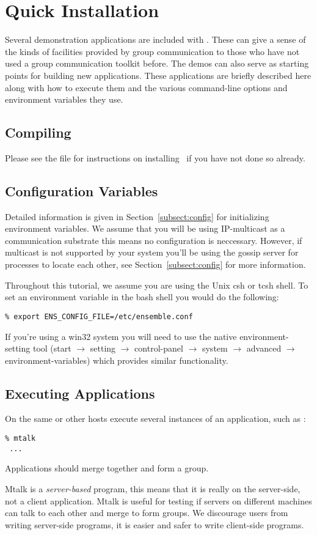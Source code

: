 \section{Quick Installation} 

Several demonstration applications are included with \ensemble.
These can give a sense of the kinds of facilities provided by group
communication to those who have not used a group communication
toolkit before.  The demos can also serve as starting points for
building new applications.  These applications are briefly described
here along with how to execute them and the various command-line
options and environment variables they use.

\subsection{Compiling}
Please see the file  for instructions on
installing \ensemble\ if you have not done so already.

\subsection{Configuration Variables}
Detailed information is given in Section~\ref{subsect:config} for
initializing environment variables. We assume that you will be using
IP-multicast as a communication substrate this means no configuration
is neccessary. However, if multicast is not supported by your system you'll
be using the gossip server for processes to locate each
other, see Section~\ref{subsect:config} for more information.

Throughout this tutorial, we assume you are using the Unix csh or
tcsh shell. To set an environment variable in the bash shell you would
do the following:
\begin{verbatim}
% export ENS_CONFIG_FILE=/etc/ensemble.conf
\end{verbatim}
If you're using a win32 system you will need to use the native
environment-setting tool
(start $\rightarrow$ setting $\rightarrow$ control-panel $\rightarrow$ system $\rightarrow$ advanced $\rightarrow$ environment-variables)
 which provides similar functionality. 

\subsection{Executing Applications}
On the same or other hosts execute several instances of an
application, such as :
\begin{verbatim}
% mtalk
 ...
\end{verbatim}

Applications should merge together and form a group. 

Mtalk is a {\it server-based} program, this means that it is really on
the server-side, not a client application. Mtalk is useful for testing
if servers on different machines can talk to each other and merge to
form groups. We discourage users from writing server-side programs, it
is easier and safer to write client-side programs. 



